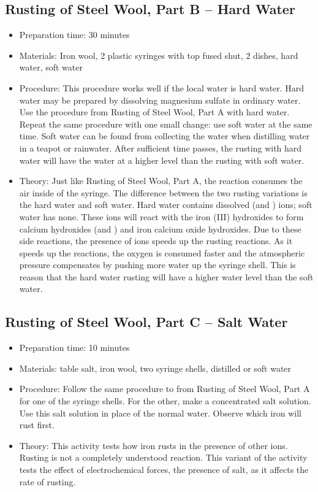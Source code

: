 \subsection{Rusting of Steel Wool, Part B -- Hard Water}
\begin{itemize}
\item{Preparation time: 30 minutes}
\item{Materials: Iron wool, 2 plastic syringes with top fused shut, 2 dishes, hard water, soft water}
\item{Procedure: This procedure works well if the local water is hard water. Hard water may be prepared by dissolving magnesium sulfate in ordinary water. Use the procedure from Rusting of Steel Wool, Part A with hard water. Repeat the same procedure with one small change: use soft water at the same time. Soft water can be found from collecting the water when distilling water in a teapot or rainwater. After sufficient time passes, the rusting with hard water will have the water at a higher level than the rusting with soft water.}
\item{Theory: Just like Rusting of Steel Wool, Part A, the reaction consumes the air inside of the syringe. The difference between the two rusting variations is the hard water and soft water. Hard water contains dissolved  (and ) ions; soft water has none. These ions will react with the iron (III) hydroxides to form calcium hydroxides (and ) and iron calcium oxide hydroxides. Due to these side reactions, the presence of  ions speeds up the rusting reactions. As it speeds up the reactions, the oxygen is consumed faster and the atmospheric pressure compensates by pushing more water up the syringe shell. This is reason that the hard water rusting will have a higher water level than the soft water.}
\end{itemize}

\subsection{Rusting of Steel Wool, Part C -- Salt Water}
\begin{itemize}
\item{Preparation time: 10 minutes}
\item{Materials: table salt, iron wool, two syringe shells, distilled or soft water}
\item{Procedure: Follow the same procedure to from Rusting of Steel Wool, Part A for one of the syringe shells. For the other, make a concentrated salt solution. Use this salt solution in place of the normal water. Observe which iron will rust first.}
\item{Theory: This activity tests how iron rusts in the presence of other ions. Rusting is not a completely understood reaction. This variant of the activity tests the effect of electrochemical forces, the presence of salt, as it affects the rate of rusting.}
\end{itemize}

